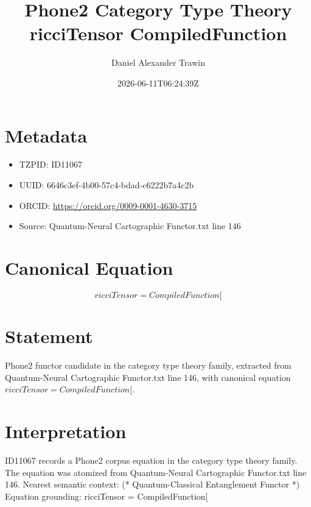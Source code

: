 \documentclass[11pt]{article}
\title{Phone2 Category Type Theory ricciTensor CompiledFunction}
\author{Daniel Alexander Trawin}
\date{2026-06-11T06:24:39Z}
\begin{document}
\maketitle
\section*{Metadata}
\begin{itemize}
\item TZPID: ID11067
\item UUID: 6646c3ef-4b00-57c4-bdad-c6222b7a4c2b
\item ORCID: \url{https://orcid.org/0009-0001-4630-3715}
\item Source: Quantum-Neural Cartographic Functor.txt line 146
\end{itemize}
\section*{Canonical Equation}
\[
ricciTensor = CompiledFunction[
\]
\section*{Statement}
Phone2 functor candidate in the category type theory family, extracted from Quantum-Neural Cartographic Functor.txt line 146, with canonical equation $ricciTensor = CompiledFunction[$.
\section*{Interpretation}
ID11067 records a Phone2 corpus equation in the category type theory family. The equation was atomized from Quantum-Neural Cartographic Functor.txt line 146. Nearest semantic context: (* Quantum-Classical Entanglement Functor *) Equation grounding: ricciTensor = CompiledFunction[
\end{document}

